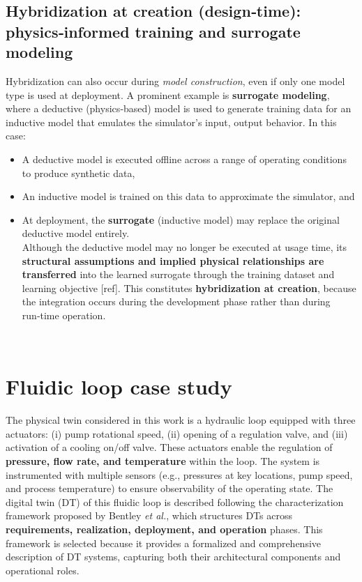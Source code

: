 \documentclass[
]{article}
\providecommand{\tightlist}{%
  \setlength{\itemsep}{0pt}\setlength{\parskip}{0pt}}
\begin{document}
\subsection{Hybridization at creation (design‑time): physics‑informed
training and surrogate
modeling}\label{hybridization-at-creation-designtime-physicsinformed-training-and-surrogate-modeling}

Hybridization can also occur during \emph{model construction}, even if
only one model type is used at deployment. A prominent example is
\textbf{surrogate modeling}, where a deductive (physics‑based) model is
used to generate training data for an inductive model that emulates the
simulator's input, output behavior. In this case:

\begin{itemize}
\tightlist
\item
  A deductive model is executed offline across a range of operating
  conditions to produce synthetic data,
\item
  An inductive model is trained on this data to approximate the
  simulator, and
\item
  At deployment, the \textbf{surrogate} (inductive model) may replace
  the original deductive model entirely.\\
  Although the deductive model may no longer be executed at usage time,
  its \textbf{structural assumptions and implied physical relationships
  are transferred} into the learned surrogate through the training
  dataset and learning objective {[}ref{]}. This constitutes
  \textbf{hybridization at creation}, because the integration occurs
  during the development phase rather than during run‑time operation.\\
  \strut \\
\end{itemize}

\section{Fluidic loop case study}\label{fluidic-loop-case-study}

The physical twin considered in this work is a hydraulic loop equipped
with three actuators: (i) pump rotational speed, (ii) opening of a
regulation valve, and (iii) activation of a cooling on/off valve. These
actuators enable the regulation of \textbf{pressure, flow rate, and
temperature} within the loop. The system is instrumented with multiple
sensors (e.g., pressures at key locations, pump speed, and process
temperature) to ensure observability of the operating state. The digital
twin (DT) of this fluidic loop is described following the
characterization framework proposed by Bentley \emph{et al.}, which
structures DTs across \textbf{requirements, realization, deployment, and
operation} phases. This framework is selected because it provides a
formalized and comprehensive description of DT systems, capturing both
their architectural components and operational roles.
\end{document}

